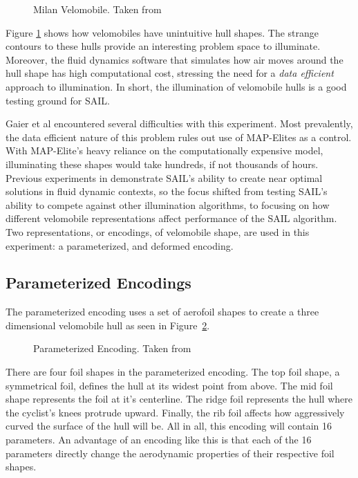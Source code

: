 \documentclass{sig-alternate}
\begin{document}
\begin{figure}[htb]
\centering
{}
\caption{Milan Velomobile. Taken from \cite{Gaier:2018}}
\label{fig:Velomobile}
\end{figure}

Figure \ref{fig:Velomobile} shows how velomobiles have unintuitive hull shapes.
The strange contours to these hulls provide an interesting problem space to illuminate.
Moreover, the fluid dynamics software that simulates how air moves around the hull shape has high computational cost, stressing the need for a \textit{data efficient} approach to illumination.
In short, the illumination of velomobile hulls is a good testing ground for SAIL.

Gaier et al encountered several difficulties with this experiment.
Most prevalently, the data efficient nature of this problem rules out use of MAP-Elites as a control.
With MAP-Elite's heavy reliance on the computationally expensive model, illuminating these shapes would take hundreds, if not thousands of hours.
Previous experiments in \cite{Gaier:2018} demonstrate SAIL's ability to create near optimal solutions in fluid dynamic contexts, so the focus shifted from testing SAIL's ability to compete against other illumination algorithms, to focusing on how different velomobile representations affect performance of the SAIL algorithm.
Two representations, or encodings, of velomobile shape, are used in this experiment: a parameterized, and deformed encoding.

\subsection{Parameterized Encodings}
The parameterized encoding uses a set of aerofoil shapes to create a three dimensional velomobile hull as seen in Figure~\ref{fig:ParameterizedEncoding}.

\begin{figure}[htb]
\centering
{}
\caption{Parameterized Encoding. Taken from \cite{Gaier:2018}}
\label{fig:ParameterizedEncoding}
\end{figure}

There are four foil shapes in the parameterized encoding.
The top foil shape, a symmetrical foil, defines the hull at its widest point from above.
The mid foil shape represents the foil at it's centerline.
The ridge foil represents the hull where the cyclist's knees protrude upward.
Finally, the rib foil affects how aggressively curved the surface of the hull will be.
All in all, this encoding will contain 16 parameters. 
An advantage of an encoding like this is that each of the 16 parameters directly change the aerodynamic properties of their respective foil shapes.
\end{document}
